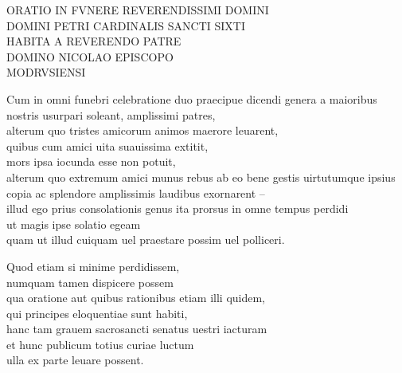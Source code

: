 \documentclass[a5paper,twoside]{article}
\begin{document}
\frenchspacing

\fontsize{11}{13.2}
\selectfont

\linespread{1.1}

\thispagestyle{empty}


\beginnumbering
\autopar


\pstart

{\centering

\noindent ORATIO IN FVNERE REVERENDISSIMI DOMINI \\
DOMINI PETRI CARDINALIS SANCTI SIXTI \\
HABITA A REVERENDO PATRE \\
DOMINO NICOLAO 
EPISCOPO \\
MODRVSIENSI

}

\pend


\bigskip

\numberpstarttrue

\setcounter{pstart}{1}

Cum in omni funebri celebratione duo praecipue dicendi genera a maioribus nostris usurpari soleant, amplissimi patres, \\
alterum quo tristes amicorum animos maerore leuarent, \\
quibus cum amici uita suauissima extitit, \\
mors ipsa iocunda esse non potuit, \\
alterum quo extremum amici munus rebus ab eo bene gestis uirtutumque ipsius copia ac splendore amplissimis laudibus exornarent – \\
illud ego prius consolationis genus ita prorsus in omne tempus perdidi \\
ut magis ipse solatio egeam \\
quam ut illud cuiquam uel praestare possim uel polliceri. 

Quod etiam si minime perdidissem, \\
numquam tamen dispicere possem \\
qua oratione aut quibus rationibus etiam illi quidem, \\
qui principes eloquentiae sunt habiti, \\
hanc tam grauem sacrosancti senatus uestri iacturam \\
et hunc publicum totius curiae luctum \\
ulla ex parte leuare possent. 
\end{document}
